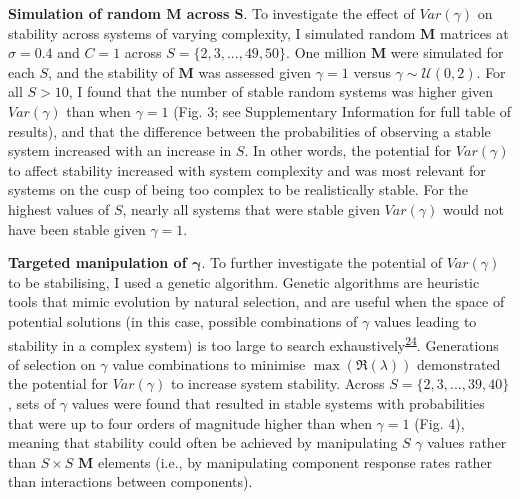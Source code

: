 \documentclass[]{article}
\begin{document}
\textbf{Simulation of random \(\mathbf{M}\) across \(\mathbf{S}\)}. To
investigate the effect of \(Var(\gamma)\) on stability across systems of
varying complexity, I simulated random \(\mathbf{M}\) matrices at
\(\sigma = 0.4\) and \(C = 1\) across \(S = \{2, 3, ..., 49, 50\}\). One
million \(\mathbf{M}\) were simulated for each \(S\), and the stability
of \(\mathbf{M}\) was assessed given \(\gamma = 1\) versus
\(\gamma \sim \mathcal{U}(0, 2)\). For all \(S > 10\), I found that the
number of stable random systems was higher given \(Var(\gamma)\) than
when \(\gamma = 1\) (Fig. 3; see Supplementary Information for full
table of results), and that the difference between the probabilities of
observing a stable system increased with an increase in \(S\). In other
words, the potential for \(Var(\gamma)\) to affect stability increased
with system complexity and was most relevant for systems on the cusp of
being too complex to be realistically stable. For the highest values of
\(S\), nearly all systems that were stable given \(Var(\gamma)\) would
not have been stable given \(\gamma = 1\).

\textbf{Targeted manipulation of \(\mathbf{\gamma}\)}. To further
investigate the potential of \(Var(\gamma)\) to be stabilising, I used a
genetic algorithm. Genetic algorithms are heuristic tools that mimic
evolution by natural selection, and are useful when the space of
potential solutions (in this case, possible combinations of \(\gamma\)
values leading to stability in a complex system) is too large to search
exhaustively\textsuperscript{\protect\hyperlink{ref-Hamblin2013}{24}}.
Generations of selection on \(\gamma\) value combinations to minimise
\(\max\left(\Re(\lambda)\right)\) demonstrated the potential for
\(Var(\gamma)\) to increase system stability. Across
\(S = \{2, 3, ..., 39, 40\}\), sets of \(\gamma\) values were found that
resulted in stable systems with probabilities that were up to four
orders of magnitude higher than when \(\gamma = 1\) (Fig. 4), meaning
that stability could often be achieved by manipulating \(S\) \(\gamma\)
values rather than \(S \times S\) \(\mathbf{M}\) elements (i.e., by
manipulating component response rates rather than interactions between
components).
\end{document}
